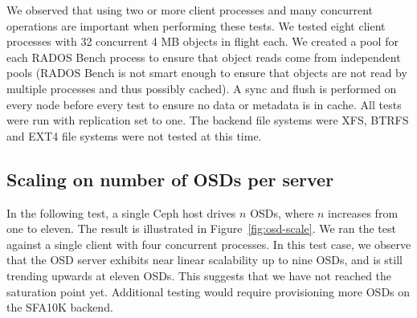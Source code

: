 \documentclass{article}
\begin{document}
We observed that using two or more client processes and many concurrent
operations are important when performing these tests.  We tested eight client processes 
with 32 concurrent 4 MB objects in flight each. We created a pool for
each RADOS Bench process to ensure that object reads come from independent pools
(RADOS Bench is not smart enough to ensure that objects are not read by multiple
processes and thus possibly cached).  A sync and flush is performed on every
node before every test to ensure no data or metadata is in cache.  All tests
were run with replication set to one.  The backend file systems were XFS,
BTRFS and EXT4 file systems were not tested at this time.


\subsection{Scaling on number of OSDs per server}

In the following test, a single Ceph host drives $n$ OSDs, where $n$ increases
from one to eleven. The result is illustrated in Figure~\ref{fig:osd-scale}.
We ran the test against a single client with four concurrent processes. In this
test case, we observe that the OSD server exhibits near linear scalability up to
nine OSDs, and is still trending upwards at eleven OSDs. This suggests that we
have not reached the saturation point yet. Additional testing would require
provisioning more OSDs on the SFA10K backend.
\end{document}

